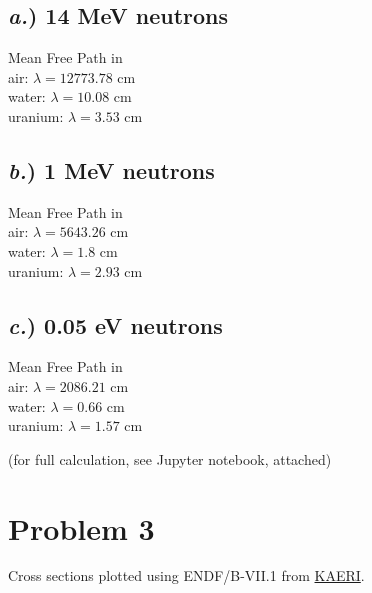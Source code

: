 \documentclass{article}
\newcommand{\tab}{\-\hspace{1cm}}
\begin{document}
\begin{multicols}{3}

\subsection*{\textit{a.}) \small 14 MeV neutrons}
Mean Free Path in\\
	\tab air:  $\lambda = 12773.78$ cm\\
	\tab water:  $\lambda = 10.08$ cm\\
	\tab uranium:  $\lambda = 3.53$ cm\\

\subsection*{\textit{b.}) \small 1 MeV neutrons}
Mean Free Path in\\
	\tab air:  $\lambda = 5643.26$ cm\\
	\tab water:  $\lambda = 1.8$ cm\\
	\tab uranium:  $\lambda = 2.93$ cm\\

\subsection*{\textit{c.}) \small 0.05 eV neutrons}
Mean Free Path in\\
	\tab air:  $\lambda = 2086.21$ cm\\
	\tab water:  $\lambda = 0.66$ cm\\
	\tab uranium:  $\lambda = 1.57$ cm\\

\end{multicols}

(for full calculation, see Jupyter notebook, attached)




\section*{Problem 3}

Cross sections plotted using ENDF/B-VII.1 from \href{http://atom.kaeri.re.kr/nuchart/}{KAERI}.
\end{document}
